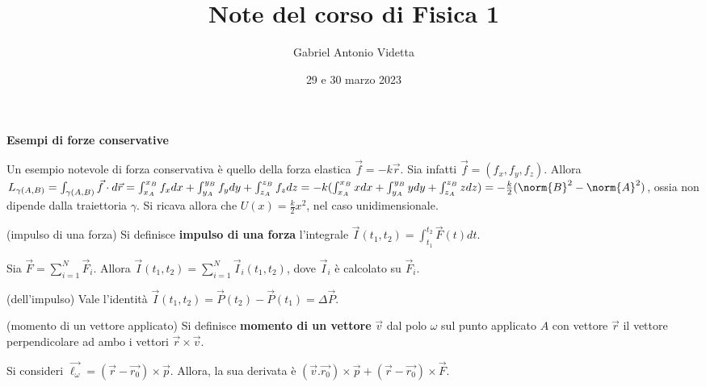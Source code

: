 \documentclass[11pt]{article}
\title{\textbf{Note del corso di Fisica 1}}
\author{Gabriel Antonio Videtta}
\date{29 e 30 marzo 2023}
\begin{document}
	
	\maketitle
	
	\begin{center}
		\Large \textbf{Esempi di forze conservative}
	\end{center}

	Un esempio notevole di forza conservativa è quello della
	forza elastica $\vec f = -k \vec r$. Sia infatti $\vec f = (f_x, f_y, f_z)$.
	Allora $L_{\gamma(A, B)} = \int_{\gamma(A, B)} \vec f \cdot d\vec r =
	\int_{x_A}^{x_B} f_x dx + \int_{y_A}^{y_B} f_y dy + \int_{z_A}^{z_B} f_z dz =
	-k (\int_{x_A}^{x_B} x dx + \int_{y_A}^{y_B} y dy + \int_{z_A}^{z_B} z dz) =
	-\frac{k}{2} (\norm{B}^2 - \norm{A}^2)$, ossia non dipende dalla traiettoria
	$\gamma$. Si ricava allora che $U(x) = \frac{k}{2} x ^2$, nel caso
	unidimensionale.
	
	
	\begin{definition} (impulso di una forza)
		Si definisce \textbf{impulso di una forza} l'integrale
		$\vec I(t_1, t_2) = \int_{t_1}^{t_2} \vec F(t) dt$.
	\end{definition}

	Sia $\vec F = \sum_{i=1}^N \vec F_i$. Allora $\vec I(t_1, t_2) =
	\sum_{i=1}^N \vec I_i(t_1, t_2)$, dove $\vec I_i$ è calcolato su $\vec F_i$.
	
	\begin{theorem} (dell'impulso)
		Vale l'identità $\vec I(t_1, t_2) = \vec P(t_2) - \vec P(t_1) = \Delta \vec P$.
	\end{theorem}

	\begin{definition} (momento di un vettore applicato)
		Si definisce \textbf{momento di un vettore} $\vec v$ dal polo
		$\omega$ sul punto applicato $A$ con vettore $\vec r$ il
		vettore perpendicolare ad ambo i vettori $\vec r \times \vec v$.
	\end{definition}

	Si consideri $\vec{\ell_\omega} = (\vec r - \vec{r_0}) \times \vec p$.
	Allora, la sua derivata è $(\vec v . \vec{r_0}) \times \vec p +
	(\vec r - \vec{r_0}) \times \vec F$.
\end{document}
